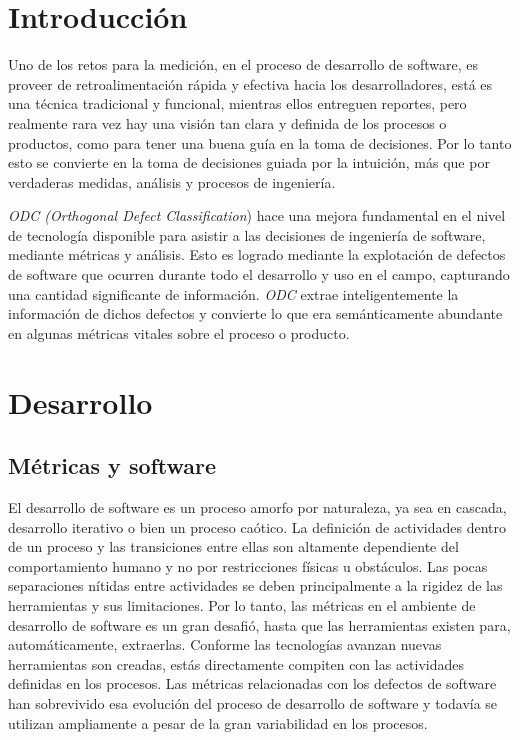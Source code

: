 \documentclass{dense_template}
\begin{document}
\maketitle
\tableofcontents
\newpage
\section{Introducción}
Uno de los retos para la medición, en el proceso de desarrollo de software, es proveer de retroalimentación rápida y efectiva hacia los desarrolladores, está es una técnica tradicional y funcional, mientras ellos entreguen reportes, pero realmente rara vez hay una visión tan clara y definida de los procesos o productos, como para tener una buena guía en la toma de decisiones. Por lo tanto esto se convierte en la toma de decisiones guiada por la intuición, más que por verdaderas medidas, análisis y procesos de ingeniería.

\textit{ODC (Orthogonal Defect Classification})  hace una mejora fundamental en el nivel de tecnología disponible para asistir a las decisiones de ingeniería de software, mediante métricas y análisis. Esto es logrado mediante la explotación de defectos de software que ocurren durante todo el desarrollo y uso en el campo, capturando una cantidad significante de información. \textit{ODC} extrae inteligentemente la información de dichos defectos y convierte lo que era semánticamente abundante en algunas métricas vitales sobre el proceso o producto.
\pagebreak
\section{Desarrollo}
\subsection{Métricas y software}
El desarrollo de software es un proceso amorfo por naturaleza, ya sea en cascada, desarrollo iterativo o bien un proceso caótico. La definición de actividades dentro de un proceso y las transiciones entre ellas son altamente dependiente del comportamiento humano y no por restricciones físicas u obstáculos. Las pocas separaciones nítidas entre actividades se deben principalmente a la rigidez de las herramientas y sus limitaciones. Por lo tanto, las métricas en el ambiente de desarrollo de software es un  gran desafió, hasta que las herramientas existen para, automáticamente, extraerlas. Conforme las tecnologías avanzan nuevas herramientas son creadas, estás directamente compiten con las actividades definidas en los procesos.
Las métricas relacionadas con los defectos de software han sobrevivido esa evolución del proceso de desarrollo de software y todavía se utilizan ampliamente a pesar de la gran variabilidad en los procesos.
\end{document}
